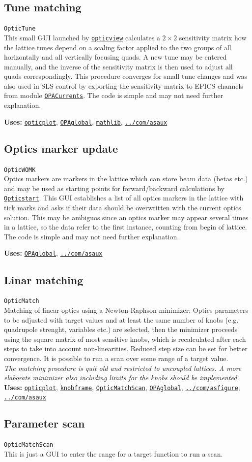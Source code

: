 \documentclass[12pt]{article}
\newcommand\code[1]{{\tt #1}}
\newcommand{\opagui}[1]{\colorbox{blue!20}{\code{#1}}}
\newcommand{\oguih}[2]{\subsection{\label{#2}#1}{\Huge\opagui{#2}}\\}
\newcommand{\ogui}[1]{\hyperref[#1]{\opagui{#1}}}
\newcommand{\opaguif}[1]{\colorbox{violet!30}{\code{#1}}}
\newcommand{\oguif}[1]{\hyperref[#1]{\opaguif{#1}}}
\newcommand{\opauni}[1]{\colorbox{orange!30}{\code{#1}}}
\newcommand{\ouni}[1]{\hyperref[#1]{\opauni{#1}}}
\newcommand{\uses}[1]{{\bf Uses: } #1}
\newcommand{\desc}[1]{#1}
\newcommand{\todo}[1]{{\color{red}\em #1}}
\begin{document}
\oguih{Tune matching}{OpticTune} 

This small GUI launched by \ogui{opticview} calculates a $2\times 2$ sensitivity matrix how the lattice tunes depend on a scaling factor applied to the two groups of all horizontally and all vertically focusing quads. A new tune may be entered manually, and the inverse of the sensitivity matrix is then used to adjust all quads correspondingly. This procedure converges for small tune changes and was also used in SLS control by exporting the sensitivity matrix to EPICS channels from module \ogui{OPACurrents}. The code is simple and may not need further explanation.

\uses{\ouni{opticplot}, \ouni{OPAglobal}, \ouni{mathlib}, \ouni{../com/asaux}} 


\oguih{Optics marker update}{OpticWOMK} 
\desc{Optics markers are markers in the lattice which can store beam data (betas etc.) and may be used as starting points for forward/backward calculations by \ogui{Opticstart}. This GUI establishes a list of all optics markers in the lattice with tick marks and asks if their data should be overwritten with the current optics solution. This may be ambiguos since an optics marker may appear several times in a lattice, so the data refer to the first instance, counting from begin of lattice. The code is simple and may not need further explanation.}

\uses{\ouni{OPAglobal}, \ouni{../com/asaux}} 




\oguih{Linar matching}{OpticMatch} 

Matching of linear optics using a Newton-Raphson minimizer: Optics parameters to be adjusted with target values and at least the same number of knobs (e.g. quadrupole strenght, variables etc.) are selected, then the minimizer proceeds using the square matrix of most sensitive knobs, which is recalculated after each steps to take into account non-linearities. Reduced step size can be set for better convergence. It is possible to run a scan over some range of a target value.\\
\todo{The matching procedure is quit old and restricted to uncoupled lattices. A more elaborate minimizer also including limits for the knobs should be implemented.}\\


\uses{\ouni{opticplot}, \oguif{knobframe}, \ogui{OpticMatchScan}, \ouni{OPAglobal},  \oguif{../com/asfigure}, \ouni{../com/asaux}} 

\oguih{Parameter scan}{OpticMatchScan}
This is just a GUI to enter the range for a target function to run a scan.\\
\end{document}
